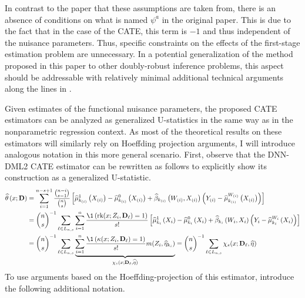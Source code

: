 In contrast to the paper that these assumptions are taken from, there is an absence of conditions on what is named $\psi^{a}$ in the original paper.   This is due to the fact that in the case of the CATE, this term is $-1$ and thus independent of the nuisance parameters.
Thus, specific constraints on the effects of the first-stage estimation problem are unnecessary.
In a potential generalization of the method proposed in this paper to other doubly-robust inference problems, this aspect should be addressable with relatively minimal additional technical arguments along the lines in \citet{chernozhukov_doubledebiased_2018}.

Given estimates of the functional nuisance parameters, the proposed CATE estimators can be analyzed as generalized U-statistics in the same way as in the nonparametric regression context.
As most of the theoretical results on these estimators will similarly rely on Hoeffding projection arguments, I will introduce analogous notation in this more general scenario.
First, observe that the DNN-DML2 CATE estimator can be rewritten as follows to explicitly show its construction as a generalized U-statistic.
\begin{equation}
    \begin{aligned}
        \hat{\theta}\left(x; \mathbf{D}\right) 
        & = \sum_{i = 1}^{n - s + 1} \frac{\binom{n-i}{s-1}}{\binom{n}{s}}
		\left[\hat{\mu}_{k_{(i)}}^{1}\left(X_{(i)}\right) - \hat{\mu}_{k_{(i)}}^{0}\left(X_{(i)}\right) + \hat{\beta}_{k_{(i)}}\left(W_{(i)}, X_{(i)}\right)\left(Y_{(i)} - \hat{\mu}^{W_{(i)}}_{k_{(i)}}\left(X_{(i)}\right)\right)\right] \\
        & = \binom{n}{s}^{-1} \sum_{\ell \in L_{n,s}}
        \sum_{i = 1}^{n}\frac{\1\left(\rk(x; Z_{i}, \mathbf{D}_{\ell}) = 1\right)}{s!} 
        \left[\hat{\mu}_{k_i}^{1}\left(X_{i}\right) - \hat{\mu}_{k_i}^{0}\left(X_{i}\right) + \hat{\beta}_{k_i}\left(W_{i}, X_{i}\right)\left(Y_{i} - \hat{\mu}^{W_{i}}_{k_i}\left(X_{i}\right)\right)\right] \\
        & = \binom{n}{s}^{-1} \sum_{\ell \in L_{n,s}}
        \underbrace{\sum_{i = 1}^{n}\frac{\1\left(\kappa(x; Z_{i}, \mathbf{D}_{\ell}) = 1\right)}{s!} 
        m(Z_{i}, \hat{\eta}_{k_i})}_{\chi_{s}(x; \mathbf{D}_{\ell}, \hat{\eta})}
        = \binom{n}{s}^{-1} \sum_{\ell \in L_{n,s}}\chi_{s}(x; \mathbf{D}_{\ell}, \hat{\eta})
    \end{aligned}
\end{equation}
To use arguments based on the Hoeffding-projection of this estimator, introduce the following additional notation.
